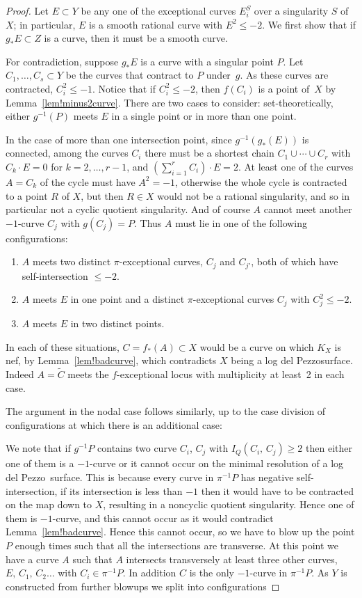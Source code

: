 \documentclass[12pt]{amsbook}
\theoremstyle{plain}
\newcommand{\ldp}{log del Pezzo}
\newcommand{\wt}[1]{\widetilde #1}
\begin{document}
\begin{proof}
Let $E\subset Y$ be any one of the exceptional curves $E_i^S$ over a singularity $S$ of $X$; in particular, $E$ is
a smooth rational curve with $E^2 \le-2$.
We first show that if $g_* E\subset Z$ is a curve, then it must be a smooth curve. 

For contradiction, suppose $g_*E$ is a curve with a singular point $P$.
Let $C_1,\dots,C_s\subset Y$ be the curves that contract to $P$ under~$g$.
As these curves are contracted, $C_i^2 \leq  -1$.
Notice that if $C_i^2\le-2$, then $f(C_i)$ is a point of~$X$
by Lemma~\ref{lem!minus2curve}.
There are two cases to consider: set-theoretically, either
$g^{-1}(P)$ meets $E$ in a single point or in more than one point.


In the case of more than one intersection point, since $g^{-1}(g_*(E))$ is connected,
among the curves $C_i$ there must be a shortest chain $C_1\cup\cdots\cup C_r$
with $C_k\cdot E=0$ for $k=2,\dots,r-1$, and $\left(\sum_{i=1}^r C_i\right)\cdot E = 2$.
At least one of the curves $A=C_k$ of the cycle must have $A^2=-1$, otherwise the
whole cycle is contracted to a point $R$ of $X$, but then $R\in X$ would not be
a rational singularity, and so in particular not a cyclic quotient singularity.
And of course $A$ cannot meet another $-1$-curve $C_j$ with $g(C_j)=P$.
Thus $A$ must lie in one of the following configurations:
\begin{enumerate}
\item
$A$ meets two distinct $\pi$-exceptional curves, $C_j$ and $C_{j'}$,
both of which have self-intersection $\le-2$.
\item
$A$ meets $E$ in one point and a distinct $\pi$-exceptional curves $C_j$
with $C_j^2\le-2$.
\item
$A$ meets $E$ in two distinct points.
\end{enumerate}
In each of these situations, $C = f_*(A)\subset X$ would be a curve
on which $K_X$ is nef, by Lemma~\ref{lem!badcurve}, which contradicts
$X$ being a \ldp surface. Indeed $A = \wt C$ meets the $f$-exceptional locus with multiplicity
at least~2 in each case.

The argument in the nodal case follows similarly, up to the case division of configurations
at which there is an additional case:

We note that if $g^{-1}{P}$ contains two curve $C_i$, $C_j$ with $I_Q (C_i, \, C_j) \ge 2$ then either one of them is a $-1$-curve or it cannot occur on the minimal resolution of a \ldp\ surface. This is because every curve in $\pi^{-1}{P}$ has negative self-intersection, if its intersection is less than $-1$ then it would have to be contracted on the map down to $X$, resulting in a noncyclic quotient singularity. Hence one of them is $-1$-curve, and this cannot occur as it would contradict Lemma~\ref{lem!badcurve}. Hence this cannot occur, so we have to blow up the point $P$ enough times such that all the intersections are transverse. At this point we have a curve $A$ such that $A$ intersects transversely at least three other curves, $E, \, C_1, \, C_2 \dots $ with $C_i \in \pi^{-1} {P}$. In addition $C$ is the only $-1$-curve in $\pi^{-1}{P}$. As $Y$ is constructed from further blowups we split into configurations 


\end{proof}
\end{document}
